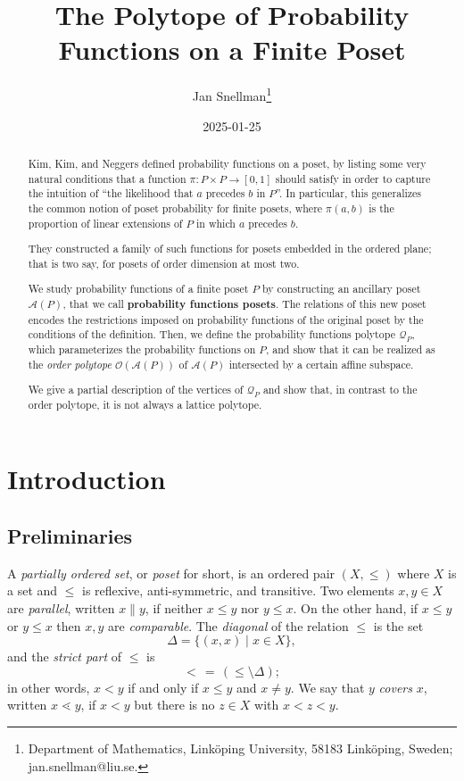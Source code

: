 \documentclass[11pt,a4paper,abstract=yes]{scrartcl}
\author{Jan Snellman\thanks{Department of Mathematics, Linköping University, 58183 Linköping, Sweden; jan.snellman@liu.se.}}
\date{2025-01-25}
\title{The Polytope of Probability Functions on a Finite Poset}
\theoremstyle{plain}
\newcommand{\prpolytope}[1]{\mathcal{Q}_{#1}}
\newcommand{\orderpolytope}[1]{\mathcal{O}({#1})}
\newcommand{\twoanti}[1]{\mathcal{A}({#1})}
\begin{document}
\maketitle



\begin{abstract}
Kim, Kim, and Neggers \autocite{neggers2019probfunc} defined probability functions on a poset,
by listing some very natural conditions that a function \(\pi: P \times P \to [0,1]\)
should satisfy in order to capture the intuition of ``the likelihood that \(a\) precedes \(b\) in \(P\)''.
In particular, this generalizes the common notion of poset probability for finite posets, where
\(\pi(a,b)\) is the proportion of linear extensions of \(P\) in which \(a\) precedes \(b\).

They constructed a family of such functions for posets embedded in the ordered plane;
that is two say, for posets of order dimension at most two.

We study probability functions of a finite poset \(P\) by constructing an
ancillary poset \(\twoanti{P}\), that we call \textbf{probability functions posets}. The relations of this
new poset encodes the restrictions imposed on probability functions of the original poset by
the conditions of the definition. Then, we define the probability functions polytope \(\prpolytope{P}\),
which parameterizes the probability functions on \(P\), and show that it can be realized
as the \emph{order polytope} \(\orderpolytope{\twoanti{P}}\) of \(\twoanti{P}\) intersected by a certain affine subspace.

We give a partial description of the vertices of \(\prpolytope{P}\) and show that, in contrast to
the order polytope, it is not always a lattice polytope.
\end{abstract}
\section{Introduction}
\label{sec:org29ca3b5}
\subsection{Preliminaries}
\label{sec:org048367c}
A \emph{partially ordered set}, or \emph{poset} for short, is an ordered pair \((X,\le)\) where \(X\) is a set and
\(\le\) is reflexive, anti-symmetric, and transitive. Two elements \(x,y \in X\) are \emph{parallel},
written \(x \parallel y\), if neither \(x \le y\) nor \(y \le x\). On the other hand, if
\(x \le y\) or \(y \le x\) then \(x,y\) are \emph{comparable}. The \emph{diagonal} of the relation \(\le\)
is the set
\[\Delta = \{(x,x) \mid x \in X\},\]
and the \emph{strict part} of \(\le\) is
\[< \, = \, (\le \setminus \Delta);\]
in other words, \(x < y\) if and only if \(x \le y\) and \(x \neq y\).
We say that \(y\) \emph{covers} \(x\), written
\(x \lessdot y\), if \(x < y\) but there is no \(z \in X\) with \(x < z < y\).
\end{document}
